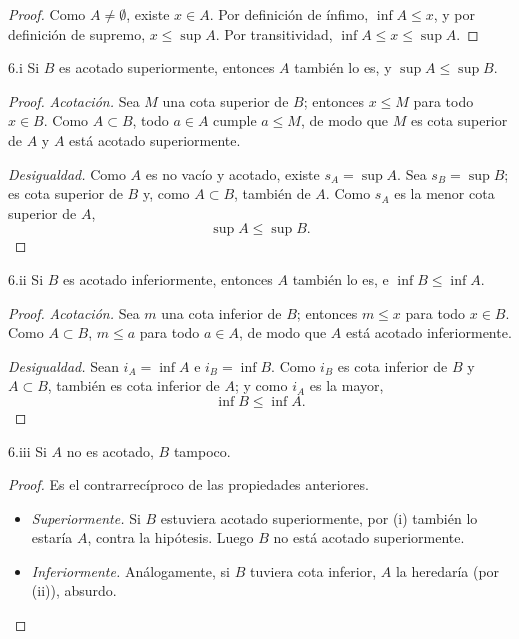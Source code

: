 \documentclass[11pt, a4paper]{article}
\begin{document}
\begin{proof}
Como $A \neq \emptyset$, existe $x \in A$. Por definición de ínfimo, $\inf A \le x$, y por
definición de supremo, $x \le \sup A$. Por transitividad, $\inf A \le x \le \sup A$.
\end{proof}

\begin{proposicion}{6.i}{}
Si $B$ es acotado superiormente, entonces $A$ también lo es, y $\sup A \le \sup B$.
\end{proposicion}

\begin{proof}
\textit{Acotación.} Sea $M$ una cota superior de $B$; entonces $x \le M$ para todo $x \in B$. Como
$A \subset B$, todo $a \in A$ cumple $a \le M$, de modo que $M$ es cota superior de $A$ y $A$ está
acotado superiormente.

\textit{Desigualdad.} Como $A$ es no vacío y acotado, existe $s_A = \sup A$. Sea $s_B = \sup B$; es
cota superior de $B$ y, como $A \subset B$, también de $A$. Como $s_A$ es la menor cota superior de
$A$,
$$ \sup A \le \sup B. $$
\end{proof}

\begin{proposicion}{6.ii}{}
Si $B$ es acotado inferiormente, entonces $A$ también lo es, e $\inf B \le \inf A$.
\end{proposicion}

\begin{proof}
\textit{Acotación.} Sea $m$ una cota inferior de $B$; entonces $m \le x$ para todo $x \in B$. Como
$A \subset B$, $m \le a$ para todo $a \in A$, de modo que $A$ está acotado inferiormente.

\textit{Desigualdad.} Sean $i_A = \inf A$ e $i_B = \inf B$. Como $i_B$ es cota inferior de $B$ y
$A \subset B$, también es cota inferior de $A$; y como $i_A$ es la mayor,
$$ \inf B \le \inf A. $$
\end{proof}

\begin{proposicion}{6.iii}{}
Si $A$ no es acotado, $B$ tampoco.
\end{proposicion}

\begin{proof}
Es el contrarrecíproco de las propiedades anteriores.
\begin{itemize}
    \item \textit{Superiormente.} Si $B$ estuviera acotado superiormente, por (i) también lo estaría
    $A$, contra la hipótesis. Luego $B$ no está acotado superiormente.
    \item \textit{Inferiormente.} Análogamente, si $B$ tuviera cota inferior, $A$ la heredaría (por
    (ii)), absurdo.
\end{itemize}
\end{proof}
\end{document}
